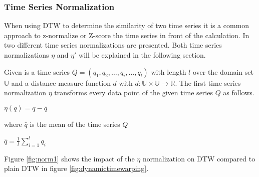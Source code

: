 \subsubsection{Time Series Normalization} \label{time_series_normalization}
When using DTW to determine the similarity of two time series it is a common approach to z-normalize or Z-score the time
series in front of the calculation. In \cite{das1998rule} two different time series normalizations are presented. Both
time series normalizations $\eta$ and $\eta '$ will be explained in the following section.

Given is a time series $Q = (q_1, q_2, \dots, q_i, \dots, q_l)$ with length $l$ over the domain set $\mathbb{U}$ and a
distance measure function $d$ with $d: \mathbb{U} \times \mathbb{U} \to \mathbb{R}$. The first time series normalization
$\eta$ transforms every data
point of the given time series $Q$ as follows.
\begin{center}
    $\eta (q) = q -\bar{q}$
\end{center}
where $\bar{q}$ is the mean of the time series $Q$
\begin{center}
    $\bar{q} = \frac{1}{l} \sum \limits_{i=1}^{l} q_i$
\end{center}
Figure \ref{fig:norm1} shows the impact of the $\eta$ normalization on DTW compared to plain DTW in figure
\ref{fig:dynamictimewarping}.

